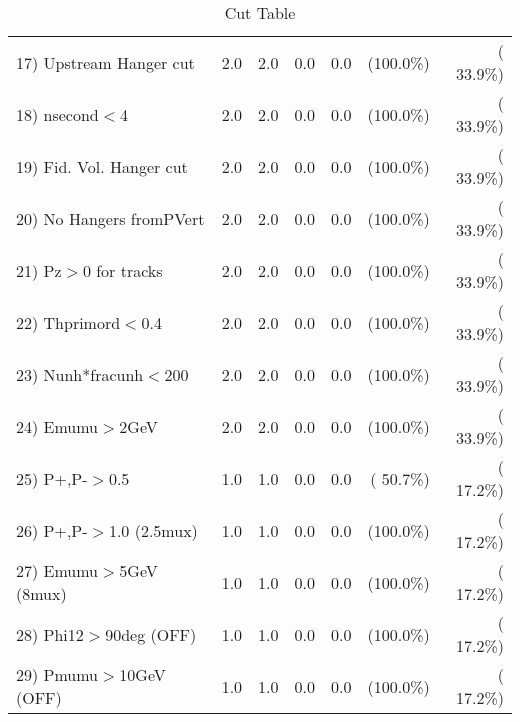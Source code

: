 \begin{table}[h!]
\begin{tabular}{||l||r|r|r|r|r|r||}
 17) Upstream Hanger cut  &          2.0 &          2.0 &          0.0 &          0.0 & (100.0\%) & ( 33.9\%) \\
 18) nsecond$<$4          &          2.0 &          2.0 &          0.0 &          0.0 & (100.0\%) & ( 33.9\%) \\
 19) Fid. Vol. Hanger cut &          2.0 &          2.0 &          0.0 &          0.0 & (100.0\%) & ( 33.9\%) \\
 20) No Hangers fromPVert &          2.0 &          2.0 &          0.0 &          0.0 & (100.0\%) & ( 33.9\%) \\
 21) Pz$>$0 for tracks    &          2.0 &          2.0 &          0.0 &          0.0 & (100.0\%) & ( 33.9\%) \\
 22) Thprimord$<$0.4      &          2.0 &          2.0 &          0.0 &          0.0 & (100.0\%) & ( 33.9\%) \\
 23) Nunh*fracunh$<$200   &          2.0 &          2.0 &          0.0 &          0.0 & (100.0\%) & ( 33.9\%) \\
 24) Emumu$>$2GeV         &          2.0 &          2.0 &          0.0 &          0.0 & (100.0\%) & ( 33.9\%) \\
 25) P+,P-$>$0.5          &          1.0 &          1.0 &          0.0 &          0.0 & ( 50.7\%) & ( 17.2\%) \\
 26) P+,P-$>$1.0 (2.5mux) &          1.0 &          1.0 &          0.0 &          0.0 & (100.0\%) & ( 17.2\%) \\
 27) Emumu$>$5GeV  (8mux) &          1.0 &          1.0 &          0.0 &          0.0 & (100.0\%) & ( 17.2\%) \\
 28) Phi12$>$90deg  (OFF) &          1.0 &          1.0 &          0.0 &          0.0 & (100.0\%) & ( 17.2\%) \\
 29) Pmumu$>$10GeV  (OFF) &          1.0 &          1.0 &          0.0 &          0.0 & (100.0\%) & ( 17.2\%) \\
 \hline
 \hline
 \end{tabular}
 \caption{Cut Table           }
 \label{tab-cutheavy_neutrino_1.000}
 \end{table}
